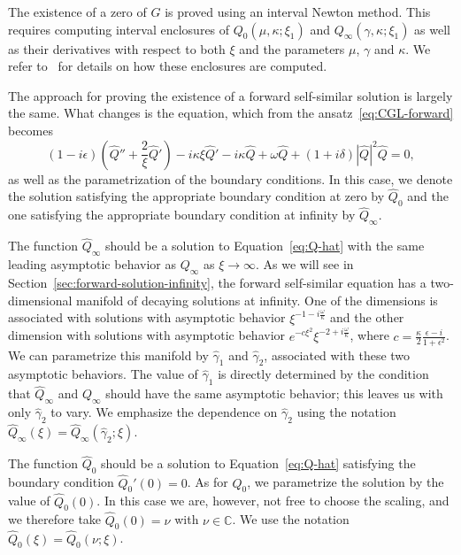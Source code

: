 \documentclass[11pt]{article}
\begin{document}
The existence of a zero of \(G\) is proved using an interval Newton
method. This requires computing interval enclosures of
\(Q_{0}(\mu, \kappa; \xi_{1})\) and
\(Q_{\infty}(\gamma, \kappa; \xi_{1})\) as well as their derivatives
with respect to both \(\xi\) and the parameters \(\mu\), \(\gamma\)
and \(\kappa\). We refer to~\cite{Dahne2024} for details on how these
enclosures are computed.

The approach for proving the existence of a forward self-similar
solution is largely the same. What changes is the equation, which
from the ansatz~\eqref{eq:CGL-forward} becomes
\begin{equation}\label{eq:Q-hat}
  (1 - i\epsilon)\left(\hat{Q}'' + \frac{2}{\xi}\hat{Q}'\right) - i\kappa\xi \hat{Q}'
  - i \kappa \hat{Q} + \omega \hat{Q} + (1 + i\delta)|\hat{Q}|^{2}\hat{Q} = 0,
\end{equation}
as well as the parametrization of the boundary conditions. In this
case, we denote the solution satisfying the appropriate boundary
condition at zero by \(\hat{Q}_{0}\) and the one satisfying the
appropriate boundary condition at infinity by \(\hat{Q}_{\infty}\).

The function \(\hat{Q}_{\infty}\) should be a solution to
Equation~\eqref{eq:Q-hat} with the same leading asymptotic behavior as
\(Q_{\infty}\) as \(\xi \to \infty\). As we will see in
Section~\ref{sec:forward-solution-infinity}, the forward self-similar
equation has a two-dimensional manifold of decaying solutions at
infinity. One of the dimensions is associated with solutions with
asymptotic behavior \(\xi^{-1 - i \frac{\omega}{\kappa}}\) and the
other dimension with solutions with asymptotic behavior
\(e^{-c\xi^{2}}\xi^{-2 + i \frac{\omega}{\kappa}}\), where
\(c = \frac{\kappa}{2}\frac{\epsilon - i}{1 + \epsilon^{2}}\). We can
parametrize this manifold by \(\hat{\gamma}_{1}\) and
\(\hat{\gamma}_{2}\), associated with these two asymptotic behaviors.
The value of \(\hat{\gamma}_{1}\) is directly determined by the
condition that \(\hat{Q}_{\infty}\) and \(Q_{\infty}\) should have the
same asymptotic behavior; this leaves us with only
\(\hat{\gamma}_{2}\) to vary. We emphasize the dependence on
\(\hat{\gamma}_{2}\) using the notation
\(\hat{Q}_{\infty}(\xi) = \hat{Q}_{\infty}(\hat{\gamma}_{2}; \xi)\).

The function \(\hat{Q}_{0}\) should be a solution to
Equation~\eqref{eq:Q-hat} satisfying the boundary condition
\(\hat{Q}_{0}'(0) = 0\). As for \(Q_{0}\), we parametrize the solution
by the value of \(\hat{Q}_{0}(0)\). In this case we are, however, not
free to choose the scaling, and we therefore take
\(\hat{Q}_{0}(0) = \nu\) with \(\nu \in \mathbb{C}\). We use the
notation \(\hat{Q}_{0}(\xi) = \hat{Q}_{0}(\nu; \xi)\).
\end{document}

